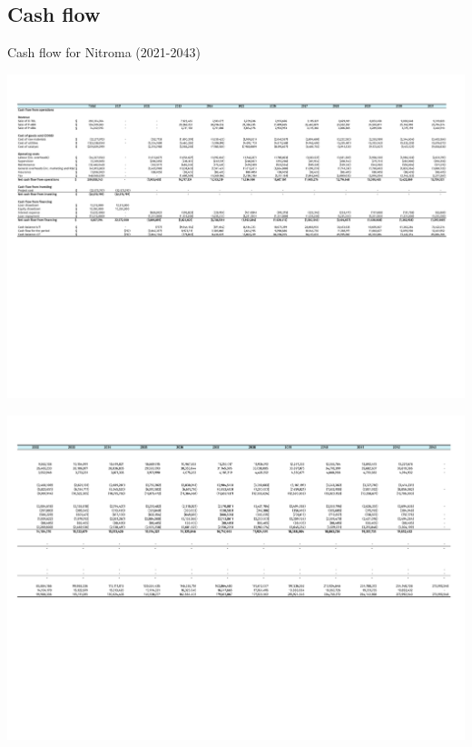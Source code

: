 \newpage
 \begin{landscape}
 \subsection{Cash flow}
\begin{table}[H]
\label{tab:CashFlow}
  \caption{Cash flow for Nitroma (2021-2043)}
\includegraphics[clip, trim=0cm 11cm 0cm 1.5cm, width=\linewidth]{chapters/Z-support/attachments/Cash1.pdf}
\end{table} 
\begin{table}[H]
\includegraphics[clip, trim=0cm 8cm 0cm 1.5cm, width=\linewidth]{chapters/Z-support/attachments/Cash2.pdf}
\end{table}
 \end{landscape}
 
